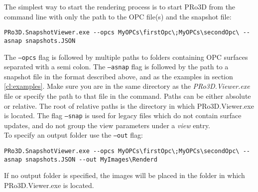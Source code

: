 The simplest way to start the rendering process is to start PRo3D from the command line with only the path to the OPC file(s) and the snapshot file:

\begin{lstlisting}
PRo3D.SnapshotViewer.exe --opcs MyOPCs\firstOpc\;MyOPCs\secondOpc\ --asnap snapshots.JSON
\end{lstlisting}

The \texttt{--opcs} flag is followed by multiple paths to folders containing OPC surfaces separated with a semi colon. The \texttt{--asnap} flag is followed by the path to a snapshot file in the format described above, and as the examples in section \ref{cl:examples}. Make sure you are in the same directory as the \emph{PRo3D.Viewer.exe} file or specify the path to that file in the command. Paths can be either absolute or relative. The root of relative paths is the directory in which PRo3D.Viewer.exe is located. The flag \texttt{--snap} is used for legacy files which do not contain surface updates, and do not group the view parameters under a \emph{view} entry.\\

To specify an output folder use the \texttt{--out} flag:

\begin{lstlisting}
PRo3D.SnapshotViewer.exe --opcs MyOPCs\firstOpc\;MyOPCs\secondOpc\ --asnap snapshots.JSON --out MyImages\Renderd
\end{lstlisting}

If no output folder is specified, the images will be placed in the folder in which PRo3D.Viewer.exe is located. 

